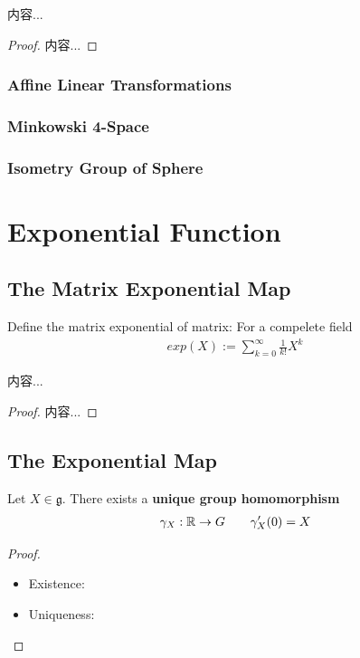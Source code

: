 \documentclass[Total.tex]{subfiles}
\begin{document}
			\begin{corollary}
				内容...
			\end{corollary}
			\begin{proof}
				内容...
			\end{proof}
			\subsubsection{Affine Linear Transformations}
			\subsubsection{Minkowski 4-Space}
			\subsubsection{Isometry Group of Sphere}
		\section{Exponential Function}
				\subsection{The Matrix Exponential Map}
			\begin{Def}
				Define the matrix exponential of matrix: For a compelete field
				\begin{gather*}
					exp(X):=\sum_{k=0}^\infty \frac{1}{k!} X^k
				\end{gather*}
			\end{Def}
			
			\begin{proposition}
				内容...
			\end{proposition}
			\begin{proof}
				内容...
			\end{proof}
			\subsection{The Exponential Map}
			\begin{proposition}
				Let $X\in \mathfrak{g}$. There exists a \textbf{unique group homomorphism}
				\begin{gather*}
					\gamma_X:\mathbb{R}\rightarrow G\qquad \gamma'_X(0)=X
				\end{gather*}
				
				
			\end{proposition}
			\begin{proof}
				\begin{itemize}
					\item Existence:
					\item Uniqueness:
				\end{itemize}
			\end{proof}
			
\end{document}

